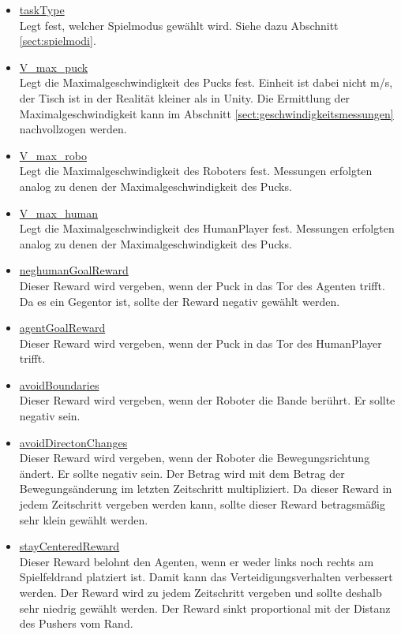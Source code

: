 \begin{itemize}
\item \underline{taskType} \\
Legt fest, welcher Spielmodus gewählt wird. Siehe dazu Abschnitt \ref{sect:spielmodi}.

\item \underline{V\_max\_puck} \\
Legt die Maximalgeschwindigkeit des Pucks fest. Einheit ist dabei nicht m/s, der Tisch ist in der Realität kleiner als in Unity. Die Ermittlung der Maximalgeschwindigkeit kann im Abschnitt \ref{sect:geschwindigkeitsmessungen} nachvollzogen werden.

\item \underline{V\_max\_robo} \\
Legt die Maximalgeschwindigkeit des Roboters fest. Messungen erfolgten analog zu denen der Maximalgeschwindigkeit des Pucks.

\item \underline{V\_max\_human} \\
Legt die Maximalgeschwindigkeit des HumanPlayer fest. Messungen erfolgten analog zu denen der Maximalgeschwindigkeit des Pucks.

\item \underline{neghumanGoalReward} \\
Dieser Reward wird vergeben, wenn der Puck in das Tor des Agenten trifft. Da es ein Gegentor ist, sollte der Reward negativ gewählt werden.

\item \underline{agentGoalReward} \\
Dieser Reward wird vergeben, wenn der Puck in das Tor des HumanPlayer trifft. 

\item \underline{avoidBoundaries} \\
Dieser Reward wird vergeben, wenn der Roboter die Bande berührt. Er sollte negativ sein. 

\item \underline{avoidDirectonChanges} \\
Dieser Reward wird vergeben, wenn der Roboter die Bewegungsrichtung ändert. Er sollte negativ sein. Der Betrag wird mit dem Betrag der Bewegungsänderung im letzten Zeitschritt multipliziert. Da dieser Reward in jedem Zeitschritt vergeben werden kann, sollte dieser Reward betragsmäßig sehr klein gewählt werden.

\item \underline{stayCenteredReward} \\
Dieser Reward belohnt den Agenten, wenn er weder links noch rechts am Spielfeldrand platziert ist. Damit kann das Verteidigungsverhalten verbessert werden. Der Reward wird zu jedem Zeitschritt vergeben und sollte deshalb sehr niedrig gewählt werden. Der Reward sinkt proportional mit der Distanz des Pushers vom Rand.


\end{itemize}
